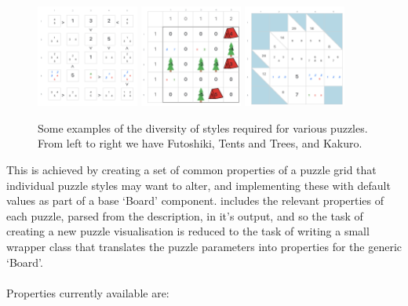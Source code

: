 \documentclass[10pt]{article}
\begin{document}
\begin{figure}[h]
    \begin{center}
    	\includegraphics[width=0.3\textwidth]{futoshikiviz}
        \includegraphics[width=0.3\textwidth]{tentsviz}
        \includegraphics[width=0.3\textwidth]{kakuroviz}
    \end{center}
   \caption{ Some examples of the diversity of styles required for various puzzles. From left to right we have Futoshiki, Tents and Trees, and Kakuro.}
\end{figure}

This is achieved by creating a set of common properties of a puzzle grid that individual puzzle styles may want to alter, and implementing these with default values as part of a base `Board' component. \demystify includes the relevant properties of each puzzle, parsed from the \eprime description, in it's output, and so the task of creating a new puzzle visualisation is reduced to the task of writing a small wrapper class that translates the \demystify puzzle parameters into properties for the generic `Board'.
\\ \\
Properties currently available are:
\end{document}
